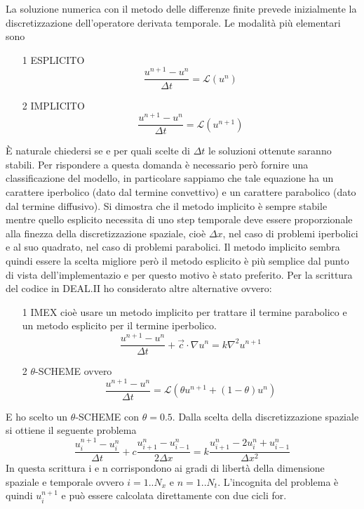 \documentclass[italian]{article}
\begin{document}
La soluzione numerica con il metodo delle differenze finite prevede inizialmente la discretizzazione dell'operatore derivata temporale. Le modalità più elementari sono
\begin{enumerate}
\item[1] ESPLICITO $$\frac{u^{n+1}-u^{n}}{\Delta t} = \mathcal{L}(u^{n})$$
\item[2] IMPLICITO $$\frac{u^{n+1}-u^{n}}{\Delta t} = \mathcal{L}(u^{n+1})$$
\end{enumerate}
È naturale chiedersi se e per quali scelte di $\Delta t$ le soluzioni ottenute saranno stabili. Per rispondere a questa domanda è necessario però fornire una classificazione del modello, in particolare sappiamo che tale equazione ha un carattere iperbolico (dato dal termine convettivo) e un carattere parabolico (dato dal termine diffusivo). Si dimostra che il metodo implicito è sempre stabile mentre quello esplicito necessita di uno step temporale deve essere proporzionale alla finezza della discretizzazione spaziale, cioè $\Delta x$, nel caso di problemi iperbolici e al suo quadrato, nel caso di problemi parabolici. Il metodo implicito sembra quindi essere la scelta migliore però il metodo esplicito è più semplice dal punto di vista dell'implementazio e per questo motivo è stato preferito. Per la scrittura del codice in DEAL.II ho considerato altre alternative ovvero:
\begin{enumerate}
\item[1] IMEX cioè usare un metodo implicito per trattare il termine parabolico e un metodo esplicito per il termine iperbolico.
$$\frac{u^{n+1}-u^{n}}{\Delta t} + \vec{c} \cdot \nabla u^n = k \nabla ^ 2 u^{n+1}$$
\item[2] $\theta$-SCHEME ovvero 
$$\frac{u^{n+1}-u^{n}}{\Delta t} = \mathcal{L}(\theta u^{n+1} + (1-\theta)u^n)$$
\end{enumerate}
E ho scelto un $\theta$-SCHEME con $\theta=0.5$.
Dalla scelta della discretizzazione spaziale si ottiene il seguente problema
$$\frac{u^{n+1}_i-u^{n}_i}{\Delta t} + c \frac{u^n_{i+1}-u^n_{i-1}}{2 \Delta x} = k \frac{u^n_{i+1}-2u^n_i+u^n_{i-1}}{\Delta x ^ 2}$$
In questa scrittura i e n corrispondono ai gradi di libertà della dimensione spaziale e temporale ovvero $i=1..N_x$ e $n=1..N_t$. L'incognita del problema è quindi $u^{n+1}_i$ e può essere calcolata direttamente con due cicli for. 
\end{document}
